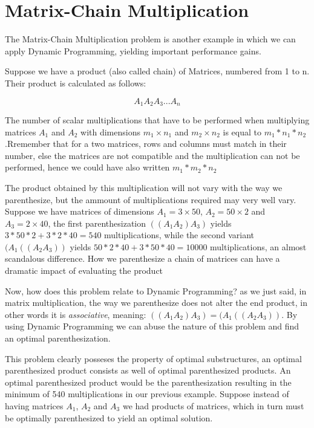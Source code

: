 \section{Matrix-Chain Multiplication}

The Matrix-Chain Multiplication problem is another example in which we can 
apply Dynamic Programming, yielding important performance gains.

Suppose we have a product (also called chain) of Matrices, numbered from 1 to n. Their product is
calculated as follows:

$$A_1A_2A_3...A_n$$

The number of scalar multiplications that have to be performed when multiplying matrices $A_1$
and $A_2$ with dimensions $m_1 \times n_1$ and $m_2\times n_2$ is equal to $m_1*n_1*n_2$ .Rremember that
for a two matrices, rows and columns must match in their number, else the matrices are not 
compatible and the multiplication can not be performed, hence we could have also written $m_1*m_2*n_2$

The product obtained by this multiplication will not vary with the way we parenthesize,
but the ammount of multiplications required may very well vary. Suppose we have
matrices of dimensions $A_1 = 3 \times 50$, $A_2 = 50 \times 2$ and $A_3 = 2 \times 40$, 
the first parenthesization $((A_1A_2)A_3)$ yields $3*50*2 + 3*2*40 = 540$
multiplications, while the second variant $(A_1((A_2A_3))$ yields 
$50*2*40 + 3*50*40 = 10000$ multiplications, an almost scandalous difference.
How we parenthesize a chain of matrices can have a dramatic impact of evaluating
the product \cite{cormen2009introduction}

Now, how does this problem relate to Dynamic Programming? as we just said, in matrix 
multiplication, the way we parenthesize does not alter the end product, in other words it is
\emph{associative}, meaning:  $((A_1A_2)A_3) = (A_1((A_2A_3))$. By using Dynamic Programming
we can abuse the nature of this problem and find an optimal parenthesization.

This problem clearly posseses the property of optimal substructures, an optimal 
parenthesized product consists as well of optimal parenthesized products. An optimal
parenthesized product would be the parenthesization resulting in the minimum of 540
multiplications in our previous example. Suppose instead of having matrices $A_1$, 
$A_2$ and $A_3$ we had products of matrices, which in turn must be optimally parenthesized
to yield an optimal solution.

